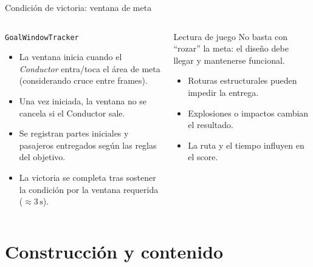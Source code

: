 \documentclass[aspectratio=169,11pt]{beamer}
\begin{document}
\begin{frame}{Condición de victoria: ventana de meta}
  \begin{columns}[T]
    \begin{block}{\texttt{GoalWindowTracker}}
      \begin{itemize}
        \item La ventana inicia cuando el \emph{Conductor} entra/toca el área de meta (considerando cruce entre frames).
        \item Una vez iniciada, la ventana no se cancela si el Conductor sale.
        \item Se registran partes iniciales y pasajeros entregados según las reglas del objetivo.
        \item La victoria se completa tras sostener la condición por la ventana requerida ($\approx 3\,\mathrm{s}$).
      \end{itemize}
    \end{block}
    \begin{block}{Lectura de juego}
      No basta con ``rozar'' la meta: el diseño debe llegar y mantenerse funcional.
      \vspace{0.15cm}
      \begin{itemize}
        \item Roturas estructurales pueden impedir la entrega.
        \item Explosiones o impactos cambian el resultado.
        \item La ruta y el tiempo influyen en el score.
      \end{itemize}
    \end{block}
  \end{columns}
\end{frame}

\section{Construcción y contenido}
\end{document}
